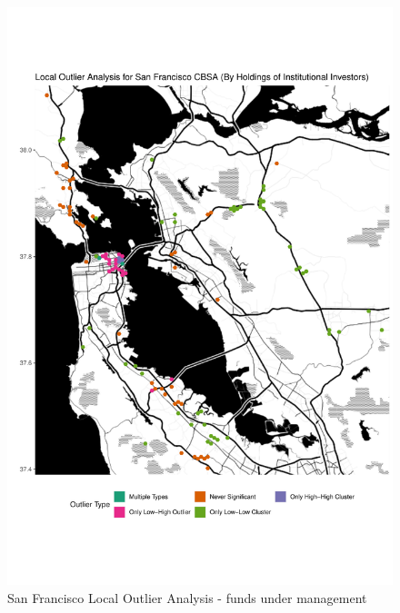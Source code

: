 \begin{figure}
	\centering
	\includegraphics[width=1\linewidth]{Figures/ChapterIV/SF_Money_LO}
	\caption[San Francisco CBSA Local Outlier Analysis - Funds Under Management 2013-2018]{San Francisco Local Outlier Analysis - funds under management}
	\label{fig:SFlocaloutlier}
\end{figure}

